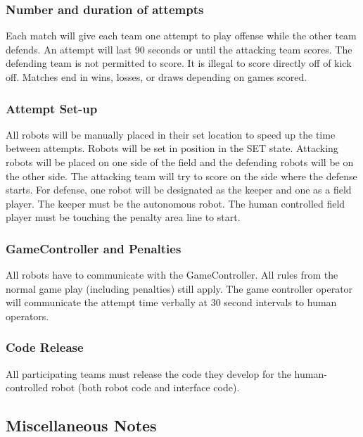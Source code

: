 \subsubsection{Number and duration of attempts}
Each match will give each team one attempt to play offense while the other team defends. An attempt will last 90 seconds or until the attacking team scores. The defending team is not permitted to score. It is illegal to score directly off of kick off. Matches end in wins, losses, or draws depending on games scored.

\subsubsection{Attempt Set-up}
All robots will be manually placed in their set location to speed up the time between attempts. Robots will be set in position in the SET state. Attacking robots will be placed on one side of the field and the defending robots will be on the other side. The attacking team will try to score on the side where the defense starts. For defense, one robot will be designated as the keeper and one as a field player. The keeper must be the autonomous robot. The human controlled field player must be touching the penalty area line to start.


\subsubsection{GameController and Penalties}
All robots have to communicate with the GameController. All rules from the normal game play (including penalties) still apply. The game controller operator will communicate the attempt time verbally at 30 second intervals to human operators.

\subsubsection{Code Release}
All participating teams must release the code they develop for the human-controlled robot (both robot code and interface code).

\subsection{Miscellaneous Notes}

